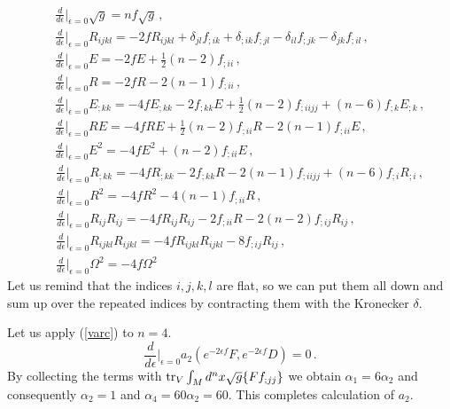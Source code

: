 \begin{eqnarray}
&&\frac d{d\epsilon} \vert_{\epsilon =0} \sqrt{g}=nf\sqrt{g} \,,
\nonumber \\
&&\frac d{d\epsilon} \vert_{\epsilon =0} R_{ijkl}=-2fR_{ijkl}
+\delta_{jl}f_{;ik} +\delta_{;ik}f_{;jl}-\delta_{il}f_{;jk}
-\delta_{jk}f_{;il} \,,\nonumber \\
&&\frac d{d\epsilon} \vert_{\epsilon =0} E=-2fE +\frac 12 (n-2)f_{;ii}
\,,\nonumber \\
&&\frac d{d\epsilon} \vert_{\epsilon =0} R =-2fR -2(n-1)f_{;ii}
\,,\nonumber \\
&&\frac d{d\epsilon} \vert_{\epsilon =0} E_{;kk} =-4fE_{;kk}
-2f_{;kk}E +\frac 12 (n-2) f_{;iijj} +(n-6)f_{;k}E_{;k}
\,,\nonumber \\ 
&&\frac d{d\epsilon} \vert_{\epsilon =0} R E = -4f R E
+\frac 12 (n-2) f_{;ii}R -2(n-1)f_{;ii}E
\,,\nonumber \\
&&\frac d{d\epsilon} \vert_{\epsilon =0} E^2 =-4fE^2 
+(n-2) f_{;ii}E
\,,\nonumber 
\end{eqnarray}\begin{eqnarray}
&&\frac d{d\epsilon} \vert_{\epsilon =0} R_{;kk} =-4fR_{;kk}
-2f_{;kk}R -2(n-1)f_{;iijj} +(n-6)f_{;i}R_{;i}
\,,\nonumber \\
&&\frac d{d\epsilon} \vert_{\epsilon =0} R^2 =-4fR^2
-4(n-1) f_{;ii} R
\,,\nonumber \\
&&\frac d{d\epsilon} \vert_{\epsilon =0} R_{ij}R_{ij} =-4fR_{ij}R_{ij}
-2f_{;ii}R -2(n-2)f_{;ij}R_{ij}
\,,\nonumber \\
&&\frac d{d\epsilon} \vert_{\epsilon =0} R_{ijkl}R_{ijkl} 
=-4fR_{ijkl}R_{ijkl} -8f_{;ij}R_{ij}
\,,\nonumber \\
&&\frac d{d\epsilon} \vert_{\epsilon =0} \Omega^2=-4f\Omega^2
\label{cvar1}
\end{eqnarray}
Let us remind that the indices $i,j,k,l$ are flat, so we can put them all
down and sum up over the repeated indices by contracting them with the
Kronecker $\delta$. 

Let us apply (\ref{varc}) to $n=4$.
\begin{equation}
\nonumber \frac{d}{d\epsilon} \vert_{\epsilon =0} a_2
(e^{-2\epsilon f}F,e^{-2\epsilon f} D)=0
\,. \end{equation}
By collecting the terms with ${\rm tr}_V\int_M d^nx\sqrt{g} \{ Ff_{;jj} \} $ we obtain
$\alpha_1=6\alpha_2$ and consequently $\alpha_2=1$ and
$\alpha_4=60\alpha_2=60$. This completes calculation of $a_2$.

